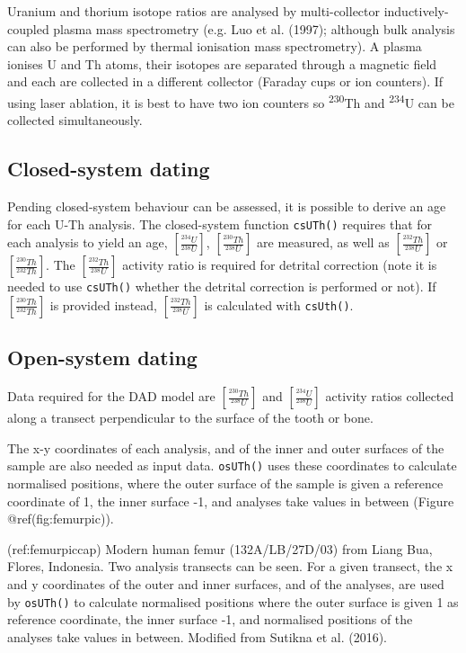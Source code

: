 \documentclass[]{elsarticle} %
\begin{document}
Uranium and thorium isotope ratios are analysed by multi-collector inductively-coupled plasma mass spectrometry (e.g. Luo et al. (1997); although bulk analysis can also be performed by thermal ionisation mass spectrometry). A plasma ionises U and Th atoms, their isotopes are separated through a magnetic field and each are collected in a different collector (Faraday cups or ion counters). If using laser ablation, it is best to have two ion counters so \textsuperscript{230}Th and \textsuperscript{234}U can be collected simultaneously.

\hypertarget{closed-system-dating}{%
\subsection{Closed-system dating}\label{closed-system-dating}}

Pending closed-system behaviour can be assessed, it is possible to derive an age for each U-Th analysis.
The closed-system function \texttt{csUTh()} requires that for each analysis to yield an age, \([\frac{^{234}U}{^{238}U}]\), \([\frac{^{230}Th}{^{238}U}]\) are measured, as well as \([\frac{^{232}Th}{^{238}U}]\) or \([\frac{^{230}Th}{^{232}Th}]\). The \([\frac{^{232}Th}{^{238}U}]\) activity ratio is required for detrital correction (note it is needed to use \texttt{csUTh()} whether the detrital correction is performed or not). If \([\frac{^{230}Th}{^{232}Th}]\) is provided instead, \([\frac{^{232}Th}{^{238}U}]\) is calculated with \texttt{csUth()}.

\hypertarget{open-system-dating}{%
\subsection{Open-system dating}\label{open-system-dating}}

Data required for the DAD model are \([\frac{^{230}Th}{^{238}U}]\) and \([\frac{^{234}U}{^{238}U}]\) activity ratios collected along a transect perpendicular to the surface of the tooth or bone.

The x-y coordinates of each analysis, and of the inner and outer surfaces of the sample are also needed as input data. \texttt{osUTh()} uses these coordinates to calculate normalised positions, where the outer surface of the sample is given a reference coordinate of 1, the inner surface -1, and analyses take values in between (Figure @ref(fig:femurpic)).

(ref:femurpiccap) Modern human femur (132A/LB/27D/03) from Liang Bua, Flores, Indonesia. Two analysis transects can be seen. For a given transect, the x and y coordinates of the outer and inner surfaces, and of the analyses, are used by \texttt{osUTh()} to calculate normalised positions where the outer surface is given 1 as reference coordinate, the inner surface -1, and normalised positions of the analyses take values in between. Modified from Sutikna et al. (2016).
\end{document}
